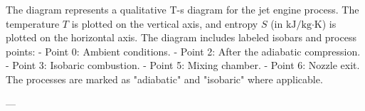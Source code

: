 The diagram represents a qualitative T-s diagram for the jet engine process. The temperature \( T \) is plotted on the vertical axis, and entropy \( S \) (in \( \text{kJ}/\text{kg·K} \)) is plotted on the horizontal axis. The diagram includes labeled isobars and process points:  
- Point 0: Ambient conditions.  
- Point 2: After the adiabatic compression.  
- Point 3: Isobaric combustion.  
- Point 5: Mixing chamber.  
- Point 6: Nozzle exit.  
The processes are marked as "adiabatic" and "isobaric" where applicable.

---